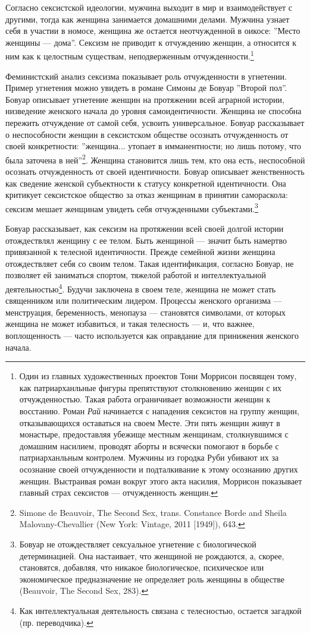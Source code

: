 \documentclass[12pt]{book}
\begin{document}
Согласно сексистской идеологии, мужчина выходит в мир и взаимодействует с другими, тогда как женщина занимается домашними делами. Мужчина узнает себя в участии в номосе, женщина же остается неотчужденной в оикосе: ''Место женщины --- дома''. Сексизм не приводит к отчуждению женщин, а относится к ним как к целостным существам, неподверженным отчужденности.\footnote{Один из главных художественных проектов Тони Моррисон посвящен тому, как патриарханльные фигуры препятствуют столкновению женщин с их отчужденностью. Такая работа ограничивает возможности женщин к восстанию. Роман \textit{Рай} начинается с нападения сексистов на группу женщин, отказывающихся оставаться на своем Месте. Эти пять женщин живут в монастыре, предоставляя убежище местным женщинам, столкнувшимся с домашним насилием, проводят аборты и всячески помогают в борьбе с патриарханльным контролем. Мужчины из городка Руби убивают их за осознание своей отчужденности и подталкивание к этому осознанию других женщин. Выстраивая роман вокруг этого акта насилия, Моррисон показывает главный страх сексистов --- отчужденность женщин.}

Феминистский анализ сексизма показывает роль отчужденности в угнетении. Пример угнетения можно увидеть в романе Симоны де Бовуар ''Второй пол''. Бовуар описывает угнетение женщин на протяжении всей аграрной истории, низведение женского начала до уровня самоидентичности. Женщина не способна пережить отчуждение от самой себя, усвоить универсальное. Бовуар рассказывает о неспособности женщин в сексистском обществе осознать отчужденность от своей конкретности: ''женщина... утопает в имманентности; но лишь потому, что была заточена в ней''\footnote{Simone de Beauvoir, The Second Sex, trans. Constance Borde and Sheila Malovany-Chevallier (New York: Vintage, 2011 [1949]), 643.}. Женщина становится лишь тем, кто она есть, неспособной осознать отчужденность от своей идентичности. Бовуар описывает женственность как сведение женской субъектности к статусу конкретной идентичности. Она критикует сексистское общество за отказ женщинам в принятии самораскола: сексизм мешает женщинам увидеть себя отчужденными субъектами.\footnote{Бовуар не отождествляет сексуальное угнетение с биологической детерминацией. Она настаивает, что женщиной не рождаются, а, скорее, становятся, добавляя, что никакое биологическое, психическое или экономическое предназначение не определяет роль женщины в обществе (Beauvoir, The Second Sex, 283).}

Бовуар рассказывает, как сексизм на протяжении всей своей долгой истории отождествлял женщину с ее телом. Быть женщиной --- значит быть намертво привязанной к телесной идентичности. Прежде семейной жизни женщина отождествляет себя со своим телом. Такая идентификация, согласно Бовуар, не позволяет ей заниматься спортом, тяжелой работой и интеллектуальной деятельностью\footnote{Как интеллектуальная деятельность связана с телесностью, остается загадкой (пр. переводчика).}. Будучи заключена в своем теле, женщина не может стать священником или политическим лидером. Процессы женского организма --- менструация, беременность, менопауза --- становятся символами, от которых женщина не может избавиться, и такая телесность --- и, что важнее, воплощенность --- часто используется как оправдание для принижения женского начала.
\end{document}
